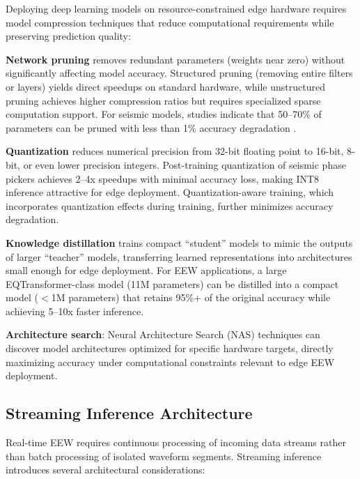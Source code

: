 \documentclass[review,authoryear]{elsarticle}
\begin{document}
Deploying deep learning models on resource-constrained edge hardware requires model compression techniques that reduce computational requirements while preserving prediction quality:

\textbf{Network pruning} removes redundant parameters (weights near zero) without significantly affecting model accuracy. Structured pruning (removing entire filters or layers) yields direct speedups on standard hardware, while unstructured pruning achieves higher compression ratios but requires specialized sparse computation support. For seismic models, studies indicate that 50--70\% of parameters can be pruned with less than 1\% accuracy degradation \citep{han2016deep}.

\textbf{Quantization} reduces numerical precision from 32-bit floating point to 16-bit, 8-bit, or even lower precision integers. Post-training quantization of seismic phase pickers achieves 2--4x speedups with minimal accuracy loss, making INT8 inference attractive for edge deployment. Quantization-aware training, which incorporates quantization effects during training, further minimizes accuracy degradation.

\textbf{Knowledge distillation} \citep{hinton2015distilling} trains compact ``student'' models to mimic the outputs of larger ``teacher'' models, transferring learned representations into architectures small enough for edge deployment. For EEW applications, a large EQTransformer-class model (11M parameters) can be distilled into a compact model ($<$1M parameters) that retains 95\%+ of the original accuracy while achieving 5--10x faster inference.

\textbf{Architecture search}: Neural Architecture Search (NAS) techniques can discover model architectures optimized for specific hardware targets, directly maximizing accuracy under computational constraints relevant to edge EEW deployment.

\subsection{Streaming Inference Architecture}

Real-time EEW requires continuous processing of incoming data streams rather than batch processing of isolated waveform segments. Streaming inference introduces several architectural considerations:
\end{document}
